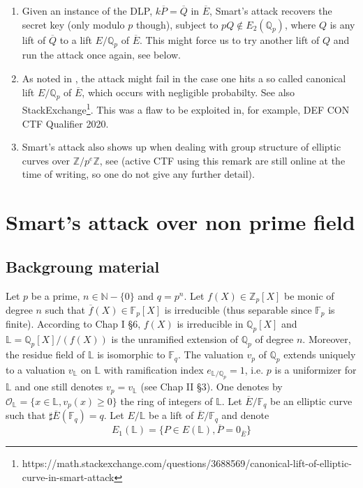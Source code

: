 \documentclass[10pt]{article}
\theoremstyle{definition}
\newcommand{\N}{\mathbb{N}}
\newcommand{\F}{\mathbb{F}}
\renewcommand{\L}{\mathbb{L}}
\newcommand{\Z}{\mathbb{Z}}
\newcommand{\Q}{\mathbb{Q}}
\begin{document}
\begin{enumerate}
\item Given an instance of the DLP, $k\overline{P} = \overline{Q}$ in $\overline{E}$, Smart's attack recovers the secret key (only modulo $p$ though), subject to $pQ \notin E_2(\Q_p)$, where $Q$ is any lift of $\overline{Q}$ to a lift $E/\Q_p$ of $\overline{E}$.
This might force us to try another lift of $Q$ and run the attack once again, see below. 
\item As noted in \cite{Sma99}, the attack might fail in the case one hits a so called canonical lift $E/\Q_p$ of $\overline{E}$, which occurs with negligible probabilty. 
See also StackExchange\footnote{https://math.stackexchange.com/questions/3688569/canonical-lift-of-elliptic-curve-in-smart-attack}.
This was a flaw to be exploited in, for example, DEF CON CTF Qualifier 2020.
\item Smart's attack also shows up when dealing with group structure of elliptic curves over $\Z/p^e\Z$, see \cite{Sala_2024} (active CTF using this remark are still online at the time of writing, so one do not give any further detail).
\end{enumerate} 

\section{Smart's attack over non prime field}

\subsection{Backgroung material}

Let $p$ be a prime, $n \in \N - \lbrace 0 \rbrace$ and $q = p^n$.
Let $f(X) \in \Z_p[X]$ be monic of degree $n$ such that $\overline{f}(X) \in \F_p[X] $ is irreducible (thus separable since $\F_p$ is finite).
According to \cite{Serre-CL} Chap I \S 6, $f(X)$ is irreducible in $\Q_p[X]$ and $\L = \Q_p[X]/(f(X))$ is the unramified extension of $\Q_p$ of degree $n$.
Moreover, the residue field of $\L$ is isomorphic to $\F_q$.
The valuation $v_p$ of $\Q_p$ extends uniquely to a valuation $v_{\L}$ on $\L$ with ramification index $e_{\L/\Q_p} = 1$, i.e. $p$ is a uniformizer for $\L$ and one still denotes $v_p = v_{\L}$ (see \cite{Serre-CL} Chap II \S 3).
One denotes by $\mathcal{O}_{\L} = \lbrace x \in \L , v_p(x)  \geq 0 \rbrace$ the ring of integers of $\L$.
Let $\overline{E}/\F_q$ be an elliptic curve such that $\sharp \overline{E}(\F_q) = q$.
Let $E/\L$ be a lift of $\overline{E}/\F_q$ and denote
\[
E_1(\L) = \lbrace P \in E(\L), \overline{P} = 0_{\overline{E}} \rbrace 
\]
\end{document}
